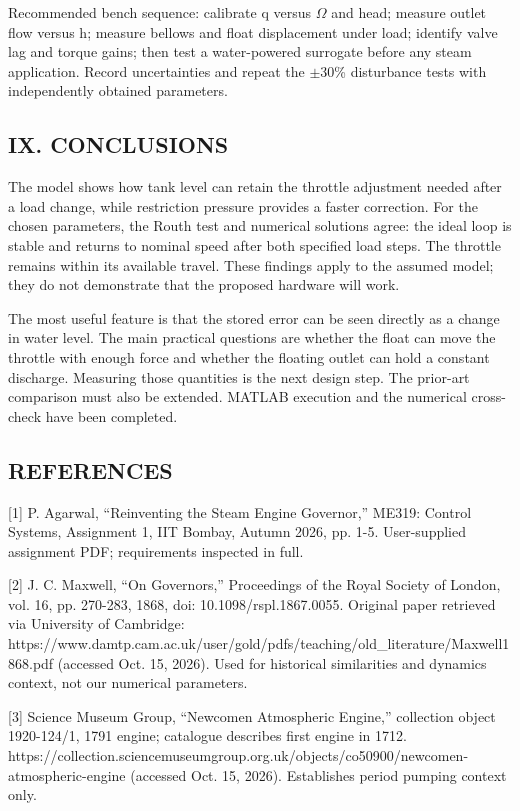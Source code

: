 \documentclass[conference]{IEEEtran}
\begin{document}
Recommended bench sequence: calibrate q versus \ensuremath{\Omega} and head; measure outlet flow versus h; measure bellows and float displacement under load; identify valve lag and torque gains; then test a water-powered surrogate before any steam application. Record uncertainties and repeat the \ensuremath{\pm}30\% disturbance tests with independently obtained parameters.

\subsection*{IX. CONCLUSIONS}
The model shows how tank level can retain the throttle adjustment needed after a load change, while restriction pressure provides a faster correction. For the chosen parameters, the Routh test and numerical solutions agree: the ideal loop is stable and returns to nominal speed after both specified load steps. The throttle remains within its available travel. These findings apply to the assumed model; they do not demonstrate that the proposed hardware will work.

The most useful feature is that the stored error can be seen directly as a change in water level. The main practical questions are whether the float can move the throttle with enough force and whether the floating outlet can hold a constant discharge. Measuring those quantities is the next design step. The prior-art comparison must also be extended. MATLAB execution and the numerical cross-check have been completed.

\subsection*{REFERENCES}
[1] P. Agarwal, ``Reinventing the Steam Engine Governor,'' ME319: Control Systems, Assignment 1, IIT Bombay, Autumn 2026, pp. 1-5. User-supplied assignment PDF; requirements inspected in full.

[2] J. C. Maxwell, ``On Governors,'' Proceedings of the Royal Society of London, vol. 16, pp. 270-283, 1868, doi: 10.1098/rspl.1867.0055. Original paper retrieved via University of Cambridge: https://www.damtp.cam.ac.uk/user/gold/pdfs/teaching/old\_literature/Maxwell1868.pdf (accessed Oct. 15, 2026). Used for historical similarities and dynamics context, not our numerical parameters.

[3] Science Museum Group, ``Newcomen Atmospheric Engine,'' collection object 1920-124/1, 1791 engine; catalogue describes first engine in 1712. https://collection.sciencemuseumgroup.org.uk/objects/co50900/newcomen-atmospheric-engine (accessed Oct. 15, 2026). Establishes period pumping context only.
\end{document}

